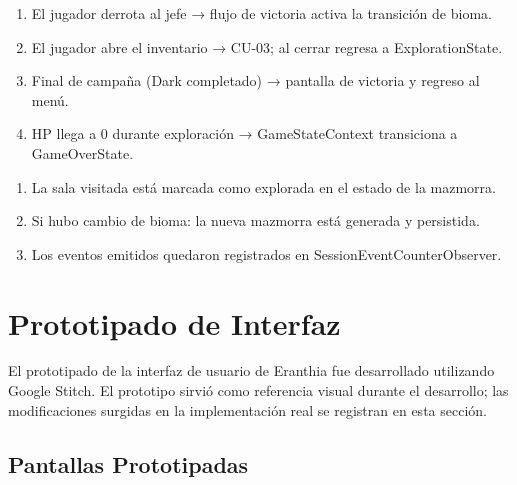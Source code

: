\documentclass[stu,12pt,floatsintext]{apa7}
\begin{document}
\begin{description}
\begin{enumerate}[label=\arabic*.]
        \end{enumerate}
    \item[Flujo Alternativo:] \hfill
        \begin{enumerate}[label=FA-\arabic*:]
            \item El jugador derrota al jefe → flujo de victoria activa la transición de bioma.
            \item El jugador abre el inventario → CU-03; al cerrar regresa a ExplorationState.
            \item Final de campaña (Dark completado) → pantalla de victoria y regreso al menú.
            \item HP llega a 0 durante exploración → GameStateContext transiciona a GameOverState.
        \end{enumerate}
    \item[Poscondiciones:] \hfill
        \begin{enumerate}[label=\arabic*.]
            \item La sala visitada está marcada como explorada en el estado de la mazmorra.
            \item Si hubo cambio de bioma: la nueva mazmorra está generada y persistida.
            \item Los eventos emitidos quedaron registrados en SessionEventCounterObserver.
        \end{enumerate}
\end{description}


\section{Prototipado de Interfaz}

El prototipado de la interfaz de usuario de Eranthia fue desarrollado utilizando Google Stitch. El prototipo sirvió como referencia visual durante el desarrollo; las modificaciones surgidas en la implementación real se registran en esta sección.

\subsection{Pantallas Prototipadas}
\end{document}
